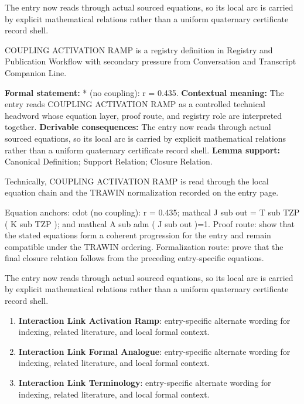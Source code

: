 The entry now reads through actual sourced equations, so its local arc is carried by explicit mathematical relations rather than a uniform quaternary certificate record shell.
\clearpage


\begingroup\small
{}
COUPLING ACTIVATION RAMP is a registry definition in Registry and Publication Workflow with secondary pressure from Conversation and Transcript Companion Line.

\begingroup\footnotesize\setlength{\emergencystretch}{3em}\sloppy
\textbf{Formal statement:} * (no coupling): r = 0.435. \textbf{Contextual meaning:} The entry reads COUPLING ACTIVATION RAMP as a controlled technical headword whose equation layer, proof route, and registry role are interpreted together. \textbf{Derivable consequences:} The entry now reads through actual sourced equations, so its local arc is carried by explicit mathematical relations rather than a uniform quaternary certificate record shell. \textbf{Lemma support:} Canonical Definition; Support Relation; Closure Relation.\par
\endgroup

Technically, COUPLING ACTIVATION RAMP is read through the local equation chain and the TRAWIN normalization recorded on the entry page.

Equation anchors: cdot (no coupling): r = 0.435; mathcal J sub out = T sub TZP ( K sub TZP ); and mathcal A sub adm ( J sub out )=1. Proof route: show that the stated equations form a coherent progression for the entry and remain compatible under the TRAWIN ordering. Formalization route: prove that the final closure relation follows from the preceding entry-specific equations.

The entry now reads through actual sourced equations, so its local arc is carried by explicit mathematical relations rather than a uniform quaternary certificate record shell.
\endgroup

\begin{enumerate}[leftmargin=1.6em,itemsep=6pt,topsep=4pt]
\item \textbf{Interaction Link Activation Ramp}: entry-specific alternate wording for indexing, related literature, and local formal context.
\item \textbf{Interaction Link Formal Analogue}: entry-specific alternate wording for indexing, related literature, and local formal context.
\item \textbf{Interaction Link Terminology}: entry-specific alternate wording for indexing, related literature, and local formal context.
\end{enumerate}


